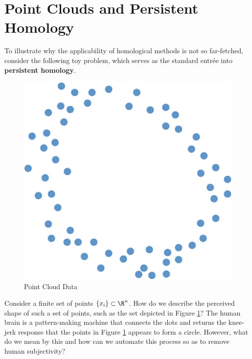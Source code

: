 \section{Point Clouds and Persistent Homology}
\label{subsec:pointclouds}

To illustrate why the applicability of homological methods is not so far-fetched, consider the following toy problem, which serves as the standard entr\'ee into \textbf{persistent homology}.
\begin{figure}[ht]
	\centering
	\includegraphics[width=.7\textwidth]{point_cloud.pdf}
	\caption{Point Cloud Data}
	\label{fig:point_cloud_data}
\end{figure}
Consider a finite set of points $\{x_i\}\subset \R^n$. How do we describe the perceived shape of such a set of points, such as the set depicted in Figure \ref{fig:point_cloud_data}? The human brain is a pattern-making machine that connects the dots and returns the knee-jerk response that the points in Figure \ref{fig:point_cloud_data} appears to form a circle. However, what do we mean by this and how can we automate this process so as to remove human subjectivity? 

